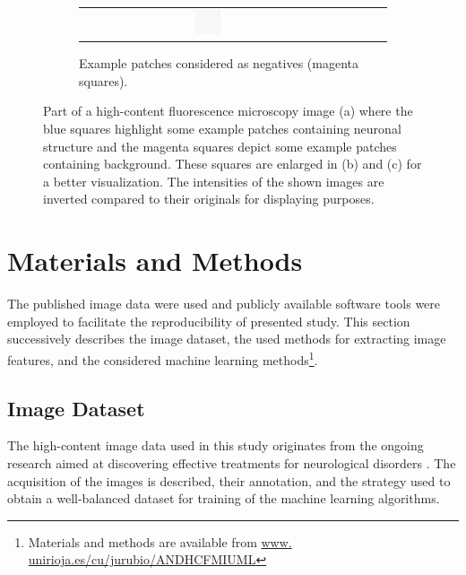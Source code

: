 \begin{figure}
\begin{subfigure}{\textwidth}
\begin{tabular}{c@{\,}c@{\,}c@{\,}c@{\,}c@{}}
			\includegraphics[width=0.1\textwidth]{fig01c15}
		\end{tabular}
		\vspace{-0.5em}
		\caption{Example patches considered as negatives (magenta squares).}
	\end{subfigure}	
	\caption{Part of a high-content fluorescence microscopy image (a) where the blue squares highlight some example patches containing neuronal structure and the magenta squares depict some example patches containing background. These squares are enlarged in (b) and (c) for a better visualization. The intensities of the shown images are inverted compared to their originals for displaying purposes.}
	\label{fig1}
\end{figure}

\section{Materials and Methods}
\label{sec:matmet}
The published image data were used and publicly available software tools were employed to facilitate the reproducibility of presented study. This section successively describes the image dataset, the used methods for extracting image features, and the considered machine learning methods\footnote{Materials and methods are available from \url{www. unirioja.es/cu/jurubio/ANDHCFMIUML}}.

\subsection{Image Dataset}
\label{sec:data}

The high-content image data used in this study originates from the ongoing research aimed at discovering effective treatments for neurological disorders \cite{cuesto2011phosphoinositide, enriquez2014learning, enriquez2016pi3k}. The acquisition of the images is described, their annotation, and the strategy used to obtain a well-balanced dataset for training of the machine learning algorithms.

